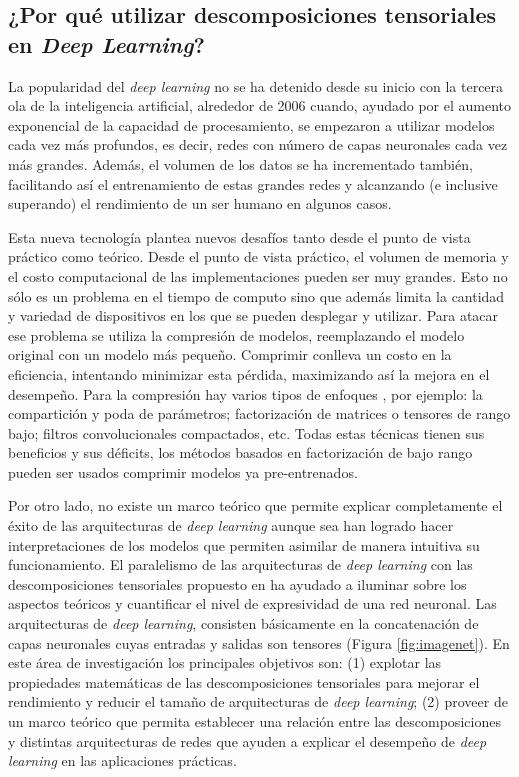 \documentclass[spanish]{article}
\theoremstyle{definition}
\theoremstyle{remark}
\numberwithin{equation}{section}
\numberwithin{equation}{section} %
\begin{document}
\subsection{¿Por qué utilizar descomposiciones tensoriales en \textit{Deep Learning}?}
La popularidad del \textit{deep learning} no se ha detenido desde su inicio con la tercera ola de la inteligencia artificial, alrededor de 2006 \cite{hinton2006fast} cuando, ayudado por el aumento exponencial de la capacidad de procesamiento, se empezaron a utilizar modelos cada vez más profundos, es decir, redes con número de capas neuronales cada vez más grandes. Además, el volumen de los datos se ha incrementado también, facilitando así el entrenamiento de estas grandes redes y alcanzando (e inclusive superando) el rendimiento de un ser humano en algunos casos. \par
Esta nueva tecnología plantea nuevos desafíos tanto desde el punto de vista práctico como teórico. Desde el punto de vista práctico, el volumen de  memoria y el costo computacional de las implementaciones pueden ser muy grandes. Esto no sólo es un problema en el tiempo de computo sino que además limita la cantidad y variedad de dispositivos en los que se pueden desplegar y utilizar. Para atacar ese problema se utiliza la compresión de modelos, reemplazando el modelo original con un modelo más pequeño. Comprimir conlleva un costo en la eficiencia, intentando minimizar esta pérdida, maximizando así la mejora en el desempeño. Para la compresión hay varios tipos de enfoques \cite{cheng2017survey}, por ejemplo: la compartición y poda de parámetros; factorización de matrices o tensores de rango bajo; filtros convolucionales compactados, etc. Todas estas técnicas tienen sus beneficios y sus déficits, los métodos basados en factorización de bajo rango  pueden ser usados comprimir modelos ya pre-entrenados. \par
Por otro lado, no existe un marco teórico que permite explicar completamente el éxito de las arquitecturas de {\it deep learning} aunque sea han logrado hacer interpretaciones de los modelos que permiten asimilar de manera intuitiva su funcionamiento. El paralelismo de las arquitecturas de {\it deep learning} con las descomposiciones tensoriales propuesto en \cite{cohen2016expressive,khrulkov2017expressive} ha ayudado a iluminar sobre los aspectos teóricos y cuantificar el nivel de expresividad de una red neuronal.
Las arquitecturas de {\it deep learning}, consisten básicamente en la concatenación de capas neuronales cuyas entradas y salidas son tensores (Figura \ref{fig:imagenet}). En este área de investigación los principales objetivos son: (1) explotar las propiedades matemáticas de las descomposiciones tensoriales para mejorar el rendimiento y reducir el tamaño de arquitecturas de \textit{deep learning}; (2) proveer de un marco teórico que permita establecer una relación entre las descomposiciones y distintas arquitecturas de redes que ayuden a explicar el desempeño de {\it deep learning} en las aplicaciones prácticas. \par
\end{document}
